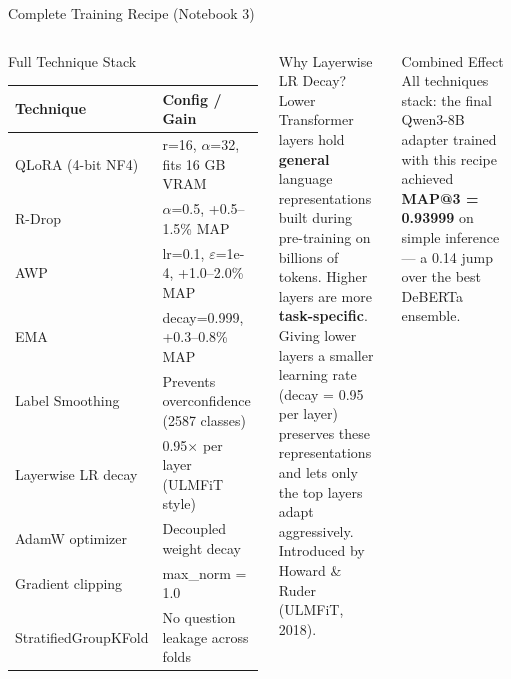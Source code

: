 ﻿\documentclass[aspectratio=169,10pt]{beamer}
\begin{document}
\begin{frame}[shrink=4]{Complete Training Recipe (Notebook 3)}
\begin{columns}[T]
\begin{block}{Full Technique Stack}
\footnotesize
\setlength{\tabcolsep}{4pt}
\renewcommand{\arraystretch}{1.2}
\begin{tabular}{p{2.6cm}p{4.0cm}}
\toprule
\textbf{Technique} & \textbf{Config / Gain}\\
\midrule
QLoRA (4-bit NF4) & r=16, $\alpha$=32, fits 16 GB VRAM\\
R-Drop & $\alpha$=0.5, +0.5--1.5\% MAP\\
AWP & lr=0.1, $\varepsilon$=1e-4, +1.0--2.0\% MAP\\
EMA & decay=0.999, +0.3--0.8\% MAP\\
Label Smoothing & Prevents overconfidence (2587 classes)\\
Layerwise LR decay & 0.95$\times$ per layer (ULMFiT style)\\
AdamW optimizer & Decoupled weight decay\\
Gradient clipping & max\_norm = 1.0\\
StratifiedGroupKFold & No question leakage across folds\\
\bottomrule
\end{tabular}
\end{block}
\begin{block}{Why Layerwise LR Decay?}
Lower Transformer layers hold \textbf{general} language representations built during pre-training on billions of tokens. Higher layers are more \textbf{task-specific}.\\[6pt]
Giving lower layers a smaller learning rate (decay = 0.95 per layer) preserves these representations and lets only the top layers adapt aggressively.\\[6pt]
Introduced by Howard \& Ruder (ULMFiT, 2018).
\end{block}
\vspace{8pt}
\begin{exampleblock}{Combined Effect}
All techniques stack: the final Qwen3-8B adapter trained with this recipe achieved \textbf{MAP@3 = 0.93999} on simple inference --- a 0.14 jump over the best DeBERTa ensemble.
\end{exampleblock}
\end{columns}
\end{frame}
\end{document}
